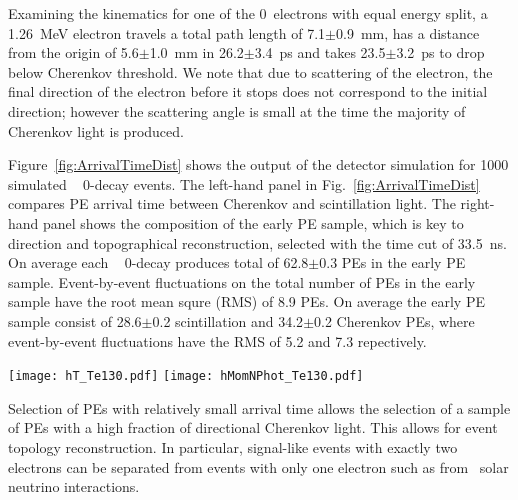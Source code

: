 Examining the kinematics for one of the 0\nbb~electrons with equal energy split, a 1.26~MeV electron travels a total path length of 
7.1$\pm$0.9~mm, 
has a distance from the origin of 5.6$\pm$1.0~mm in 26.2$\pm$3.4~ps  and takes 23.5$\pm$3.2~ps to drop below Cherenkov threshold. 
We note that due to scattering of the electron, the final direction of the electron before it stops does not correspond to the initial 
direction; however the scattering angle is small at the time the majority of Cherenkov light is produced.

Figure~\ref{fig:ArrivalTimeDist} shows the output of the detector simulation for 1000 simulated \Te~ 0\nbb-decay 
events. The left-hand panel in Fig.~\ref{fig:ArrivalTimeDist} compares PE arrival time between Cherenkov and scintillation light.
The right-hand panel shows the composition of the early PE sample, which is key to direction and topographical reconstruction, 
selected with the time cut of 33.5~ns. On average each \Te~ 0\nbb-decay produces total of 62.8$\pm$0.3 PEs in the early PE sample. 
Event-by-event fluctuations on the total number of PEs in the early sample have the root mean squre (RMS) of 8.9 PEs. 
On average the early PE sample consist of 28.6$\pm$0.2 scintillation and 34.2$\pm$0.2 Cherenkov PEs, where event-by-event fluctuations have
the RMS of 5.2 and 7.3 repectively.



\begin{figure*}[ht]
  \centering
  \texttt{[image: hT\_Te130.pdf]}
  \texttt{[image: hMomNPhot\_Te130.pdf]}
  \caption{\emph{Left:} Photo-electron (PE) arrival times after
    application of the photo-detector transit time spread (TTS) of 100~ps for the default simulation 
    of \Te~0\nbb-decay produced at the center of the detector. 
    Scintillation PEs (blue solid line) are compared to Cherenkov PEs (red dotted line)
    The vertical line at 33.5~ns indicates the time cut for the selection of the early PE sample.
    \emph{Right:} Composition of the early PE sample: 
    number of Cherenkov (\emph{dashed red line}), scintillation (\emph{dotted blue line}), 
    and total (\emph{solid black line}) PEs per event.} 
\label{fig:ArrivalTimeDist}
\end{figure*}


Selection of PEs with relatively small arrival time allows the selection of a sample of PEs with a high fraction of directional Cherenkov light.
This allows for event topology reconstruction. In particular, signal-like events with exactly two electrons can be separated from events 
with only one electron such as from \B~solar neutrino interactions.


